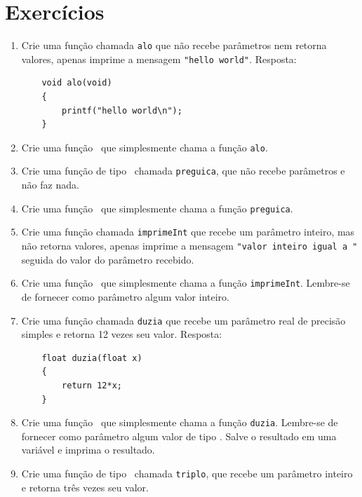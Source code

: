 \section{Exercícios}

  \begin{enumerate}
    \item Crie uma função chamada {\tt alo} que não recebe parâmetros nem retorna valores, apenas imprime a mensagem \verb|"hello world"|.
	Resposta:
\begin{lstlisting}
	void alo(void)
	{
		printf("hello world\n");
	}
\end{lstlisting}

    \item Crie uma função \MAIN\ que simplesmente chama a função {\tt alo}.

    \item Crie uma função de tipo \VOID\ chamada {\tt preguica}, que não recebe parâmetros e não faz nada.

    \item Crie uma função \MAIN\ que simplesmente chama a função {\tt preguica}.

    \item Crie uma função chamada {\tt imprimeInt} que recebe um parâmetro inteiro, mas não retorna valores, apenas imprime a mensagem \verb|"valor inteiro igual a "| seguida do valor do parâmetro recebido.

    \item Crie uma função \MAIN\ que simplesmente chama a função {\tt imprimeInt}. Lembre-se de fornecer como parâmetro algum valor inteiro.

    \item Crie uma função chamada {\tt duzia} que recebe um parâmetro real de precisão simples e retorna 12 vezes seu valor.
	Resposta:
\begin{lstlisting}
	float duzia(float x)
	{
		return 12*x;
	}
\end{lstlisting}

    \item Crie uma função \MAIN\ que simplesmente chama a função {\tt duzia}. Lembre-se de fornecer como parâmetro algum valor de tipo \FLOAT. Salve o resultado em uma variável e imprima o resultado.

    \item Crie uma função de tipo \INT\ chamada {\tt triplo}, que recebe um parâmetro inteiro e retorna três vezes seu valor.


\end{enumerate}
